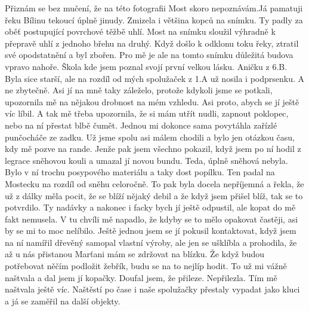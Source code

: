 
Přiznám se bez mučení, že na této fotografii Most skoro nepoznávám.Já
pamatuji řeku Bílinu tekoucí úplně jinudy. Zmizela i většina kopců na
snímku. Ty padly za oběť postupující povrchové těžbě uhlí. Most na
snímku sloužil výhradně k přepravě uhlí z jednoho břehu na druhý. Když
došlo k odklonu toku řeky, ztratil své opodstatnění a byl zbořen. Pro
mě je ale na tomto snímku důležitá budova vpravo nahoře. Škola kde
jsem poznal svojí první velkou lásku. Aničku z 6.B. Byla sice starší,
ale na rozdíl od mých spolužaček z 1.A už nosila i podprsenku. A ne
zbytečně. Asi jí na mně taky záleželo, protože kdykoli jsme se
potkali, upozornila mě na nějakou drobnost na mém vzhledu. Asi proto,
abych se jí ještě víc líbil. A tak mě třeba upozornila, že si mám
utřít nudli, zapnout poklopec, nebo na ní přestat blbě čumět. Jednou
mi dokonce sama povytáhla zařízlé punčocháče ze zadku. Už jsme spolu
asi málem chodili a bylo jen otázkou času, kdy mě pozve na rande.
Jenže pak jsem všechno pokazil, když jsem po ní hodil z legrace
sněhovou kouli a umazal jí novou bundu. Teda, úplně sněhová nebyla.
Bylo v ní trochu posypového materiálu a taky dost popílku. Ten padal
na Mostecku na rozdíl od sněhu celoročně. To pak byla docela
nepříjemná a řekla, že už z dálky měla pocit, že se blíží nějaký debil
a že když jsem přišel blíž, tak se to potvrdilo. Ty nadávky a nakonec
i facky bych jí ještě odpustil, ale kopat do mě fakt nemusela. V tu
chvíli mě napadlo, že kdyby se to mělo opakovat častěji, asi by se mi
to moc nelíbilo. Ještě jednou jsem se jí pokusil kontaktovat, když
jsem na ní namířil dřevěný samopal vlastní výroby, ale jen se ušklíbla
a prohodila, že až u nás přistanou Marťani mám se zdržovat na blízku.
Že když budou potřebovat něčím podložit žebřík, budu se na to nejlíp
hodit. To už mi vážně naštvala a dal jsem jí kopačky. Doufal jsem, že
přileze. Nepřilezla. Tím mě naštvala ještě víc. Naštěstí po čase i
naše spolužačky přestaly vypadat jako kluci a já se zaměřil na další
objekty.
